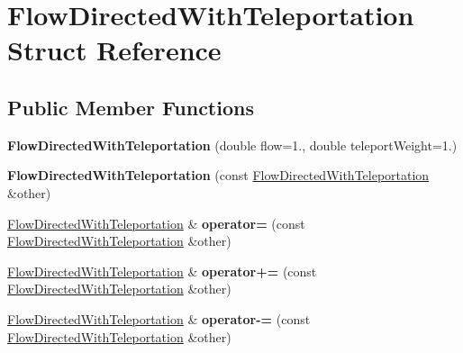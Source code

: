 \hypertarget{structFlowDirectedWithTeleportation}{}\section{Flow\+Directed\+With\+Teleportation Struct Reference}
\label{structFlowDirectedWithTeleportation}
\subsection*{Public Member Functions}
\begin{DoxyCompactItemize}
\item 
\mbox{\label{structFlowDirectedWithTeleportation_afb939fd61d6e15bd5d2d16d0b9444953}} 
{\bfseries Flow\+Directed\+With\+Teleportation} (double flow=1., double teleport\+Weight=1.)
\item 
\mbox{\label{structFlowDirectedWithTeleportation_aa85c7181990001cff096d00c233e0a41}} 
{\bfseries Flow\+Directed\+With\+Teleportation} (const \mbox{\hyperlink{structFlowDirectedWithTeleportation}{Flow\+Directed\+With\+Teleportation}} \&other)
\item 
\mbox{\label{structFlowDirectedWithTeleportation_ab2b26f20c870bd4daf6c998ef64b0e4c}} 
\mbox{\hyperlink{structFlowDirectedWithTeleportation}{Flow\+Directed\+With\+Teleportation}} \& {\bfseries operator=} (const \mbox{\hyperlink{structFlowDirectedWithTeleportation}{Flow\+Directed\+With\+Teleportation}} \&other)
\item 
\mbox{\label{structFlowDirectedWithTeleportation_a0f09b43f20ac643e16ff291173352e97}} 
\mbox{\hyperlink{structFlowDirectedWithTeleportation}{Flow\+Directed\+With\+Teleportation}} \& {\bfseries operator+=} (const \mbox{\hyperlink{structFlowDirectedWithTeleportation}{Flow\+Directed\+With\+Teleportation}} \&other)
\item 
\mbox{\label{structFlowDirectedWithTeleportation_a12002d8ecb438462df8cf19e898b9bce}} 
\mbox{\hyperlink{structFlowDirectedWithTeleportation}{Flow\+Directed\+With\+Teleportation}} \& {\bfseries operator-\/=} (const \mbox{\hyperlink{structFlowDirectedWithTeleportation}{Flow\+Directed\+With\+Teleportation}} \&other)
\end{DoxyCompactItemize}
